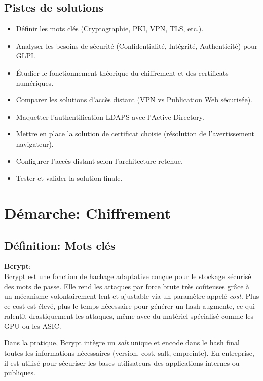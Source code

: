 \subsection*{Pistes de solutions}
{}
\begin{itemize}
  \item Définir les mots clés (Cryptographie, PKI, VPN, TLS, etc.).
  \item Analyser les besoins de sécurité (Confidentialité, Intégrité, Authenticité) pour GLPI.
  \item Étudier le fonctionnement théorique du chiffrement et des certificats numériques.
  \item Comparer les solutions d'accès distant (VPN vs Publication Web sécurisée).
  \item Maquetter l'authentification LDAPS avec l'Active Directory.
  \item Mettre en place la solution de certificat choisie (résolution de l'avertissement navigateur).
  \item Configurer l'accès distant selon l'architecture retenue.
  \item Tester et valider la solution finale.
\end{itemize}

\clearpage
\section*{Démarche: Chiffrement}

\subsection*{Définition: Mots clés}
{}

\medskip
\noindent \textbf{Bcrypt}:\\
Bcrypt est une fonction de hachage adaptative conçue pour le stockage sécurisé des mots de passe. Elle rend les attaques par force brute très coûteuses grâce à un mécanisme volontairement lent et ajustable via un paramètre appelé \textit{cost}. Plus ce cost est élevé, plus le temps nécessaire pour générer un hash augmente, ce qui ralentit drastiquement les attaques, même avec du matériel spécialisé comme les GPU ou les ASIC. 

\noindent Dans la pratique, Bcrypt intègre un \textit{salt} unique et encode dans le hash final toutes les informations nécessaires (version, cost, salt, empreinte). En entreprise, il est utilisé pour sécuriser les bases utilisateurs des applications internes ou publiques.\\

